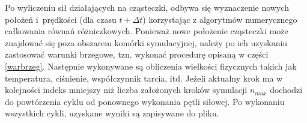 \documentclass[12pt,a4paper,openright]{report} %
\begin{document}
Po wyliczeniu sił działających na cząsteczki, odbywa się wyznaczenie nowych położeń i~prędkości (dla czasu $t+\Delta t$) korzystając z algorytmów numerycznego całkowania równań różniczkowych. Ponieważ nowe położenie cząsteczki może znajdować się poza obszarem komórki symulacyjnej, należy po ich uzyskaniu zastosować warunki brzegowe, tzn. wykonać procedurę opisaną w części \ref{warbrzeg}. Następnie wykonywane są obliczenia wielkości fizycznych takich jak temperatura, ciśnienie, współczynnik tarcia, itd. Jeżeli aktualny krok ma w kolejności indeks mniejszy niż liczba założonych kroków symulacji $n_{max}$ dochodzi do powtórzenia cyklu od ponownego wykonania pętli siłowej. Po wykonaniu wszystkich cykli, uzyskane wyniki są zapisywane do pliku.
%
%

\end{document}
